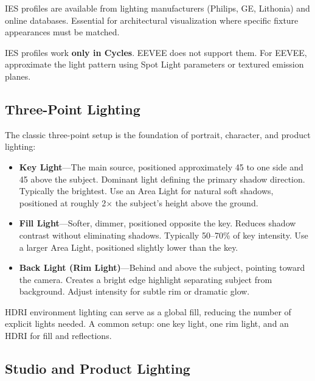 IES profiles are available from lighting manufacturers (Philips, GE,
Lithonia) and online databases. Essential for architectural
visualization where specific fixture appearances must be matched.

\begin{warningbox}
IES profiles work \textbf{only in Cycles}. EEVEE does not support
them. For EEVEE, approximate the light pattern using Spot Light
parameters or textured emission planes.
\end{warningbox}

\subsection{Three-Point Lighting}
\label{sec:shading:lighting:threepoint}

The classic three-point setup is the foundation of portrait,
character, and product lighting:

\begin{itemize}[leftmargin=2em]
  \item \textbf{Key Light}---The main source, positioned approximately
        45\textdegree{} to one side and 45\textdegree{} above the subject.
        Dominant light defining the primary shadow direction. Typically
        the brightest. Use an Area Light for natural soft shadows,
        positioned at roughly 2$\times$ the subject's height above the
        ground.
  \item \textbf{Fill Light}---Softer, dimmer, positioned opposite the
        key. Reduces shadow contrast without eliminating shadows.
        Typically 50--70\% of key intensity. Use a larger Area Light,
        positioned slightly lower than the key.
  \item \textbf{Back Light (Rim Light)}---Behind and above the
        subject, pointing toward the camera. Creates a bright edge
        highlight separating subject from background. Adjust intensity
        for subtle rim or dramatic glow.
\end{itemize}

\begin{tipbox}
HDRI environment lighting can serve as a global fill, reducing the
number of explicit lights needed. A common setup: one key light,
one rim light, and an HDRI for fill and reflections.
\end{tipbox}

\subsection{Studio and Product Lighting}

